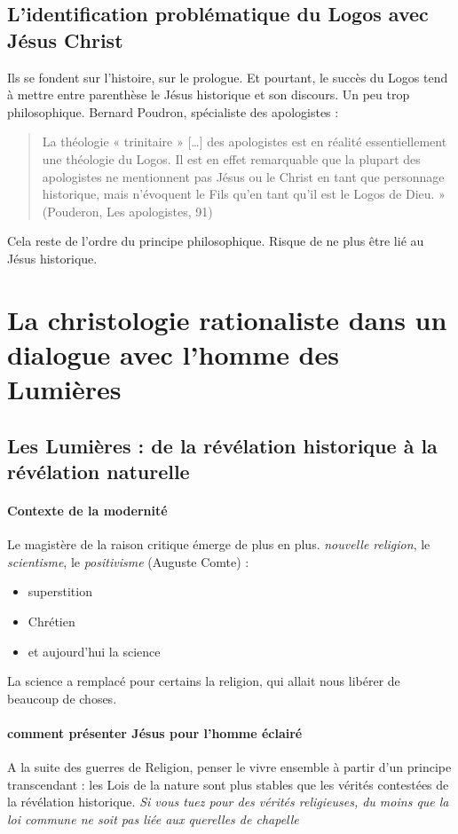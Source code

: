  
\subsection{L’identification problématique du Logos avec Jésus Christ} Ils se fondent sur l'histoire, sur le prologue. Et pourtant, le succès du Logos tend à mettre entre parenthèse le Jésus historique et son discours. Un peu trop philosophique.
Bernard Poudron, spécialiste des apologistes : 
 \begin{quote}
    La théologie « trinitaire » […] des apologistes est en réalité essentiellement une théologie du
Logos. Il est en effet remarquable que la plupart des apologistes ne mentionnent pas Jésus ou
le Christ en tant que personnage historique, mais n’évoquent le Fils qu’en tant qu’il est le
Logos de Dieu. » (Pouderon, Les apologistes, 91)
\end{quote}
Cela reste de l'ordre du principe philosophique. Risque de ne plus être lié au Jésus historique.



\section{ La christologie rationaliste dans un dialogue avec l’homme des Lumières}


 \subsection{Les Lumières : de la révélation historique à la révélation naturelle}

 \paragraph{Contexte de la modernité} Le magistère de la raison critique émerge de plus en plus. \textit{nouvelle religion}, le \textit{scientisme}, le \textit{positivisme} (Auguste Comte) :
 \begin{itemize}
     \item superstition
     \item Chrétien
     \item et aujourd'hui la science
 \end{itemize}
La science a remplacé pour certains la religion, qui allait nous libérer de beaucoup de choses.


\paragraph{comment présenter Jésus pour l'homme éclairé} A la suite des guerres de Religion, penser le vivre ensemble à partir d'un principe transcendant : les Lois de la nature sont plus stables que les vérités contestées de la révélation historique. \textit{Si vous tuez pour des vérités religieuses, du moins que la loi commune ne soit pas liée aux querelles de chapelle}
